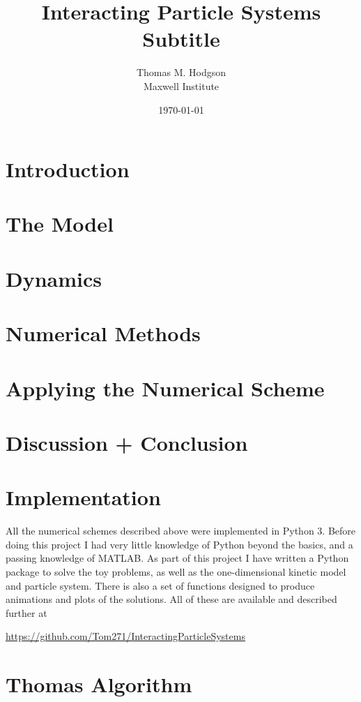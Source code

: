 \documentclass[11pt, a4paper]{article}
\title{{\huge Interacting Particle Systems} \\ \vspace{1cm} Subtitle}
\author{Thomas M. Hodgson\\ \vspace{0.5cm} Maxwell Institute}
\date{\today}
\begin{document}
	\maketitle
    \thispagestyle{empty}
	\newpage
	\tableofcontents
	\listoffigures
	\newpage   
	\section{Introduction}\label{sec:introduction}
        
       
	\section{The Model}\label{sec:model}
        
        
	\section{Dynamics}\label{sec:dynamics}
        
        
   	\section{Numerical Methods}\label{sec:numericalmethods}
        
 
    \section{Applying the Numerical Scheme}\label{sec:application}
        
        
    \section{Discussion + Conclusion}\label{sec:conclusion}
        

    
    
    \appendix
    \section{Implementation}\label{app:code}
    All the numerical schemes described above were implemented in Python 3. Before doing this project I had very little knowledge of Python beyond the basics, and a passing knowledge of MATLAB. As part of this project I have written a Python package to solve the toy problems, as well as the one-dimensional kinetic model and particle system. There is also a set of functions designed to produce animations and plots of the solutions. All of these are available and described further at 
    \begin{center}\url{https://github.com/Tom271/InteractingParticleSystems}\end{center}
 
    \section{Thomas Algorithm}\label{app:thomas}
    
\end{document}
